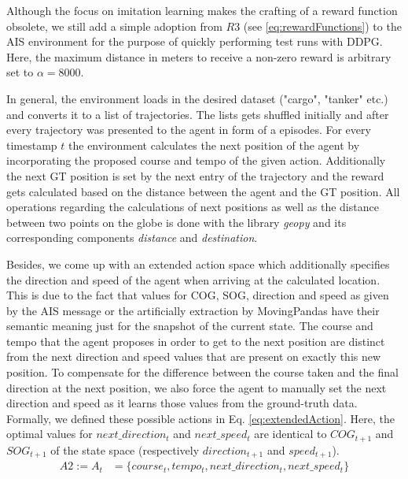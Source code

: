 Although the focus on imitation learning makes the crafting of a reward function obsolete, we still add a simple adoption from $R3$ (see \ref{eq:rewardFunctions}) to the AIS environment for the purpose of quickly performing test runs with DDPG. Here, the maximum distance in meters to receive a non-zero reward is arbitrary set to $\alpha=8000$.
\par
In general, the environment loads in the desired dataset ("cargo", "tanker" etc.) and converts it to a list of trajectories. The lists gets shuffled initially and after every trajectory was presented to the agent in form of a episodes. For every timestamp $t$ the environment calculates the next position of the agent by incorporating the proposed course and tempo of the given action. Additionally the next GT position is set by the next entry of the trajectory and the reward gets calculated based on the distance between the agent and the GT position. All operations regarding the calculations of next positions as well as the distance between two points on the globe is done with the library \textit{geopy} and its corresponding components \textit{distance} and \textit{destination}.
\par
Besides, we come up with an extended action space which additionally specifies the direction and speed of the agent when arriving at the calculated location. This is due to the fact that values for COG, SOG, direction and speed as given by the AIS message or the artificially extraction by MovingPandas have their semantic meaning just for the snapshot of the current state. The course and tempo that the agent proposes in order to get to the next position are distinct from the next direction and speed values that are present on exactly this new position. To compensate for the difference between the course taken and the final direction at the next position, we also force the agent to manually set the next direction and speed as it learns those values from the ground-truth data. Formally, we defined these possible actions in Eq.  \ref{eq:extendedAction}. Here, the optimal values for $next\_direction_t$ and $next\_speed_t$ are identical to $COG_{t+1}$ and $SOG_{t+1}$ of the state space (respectively $direction_{t+1}$ and $speed_{t+1}$).
\begin{equation}
\begin{aligned}
    A2 := A_t &= \{course_t, tempo_t, next\_direction_t, next\_speed_t\}
    \end{aligned}
\end{equation} \label{eq:extendedAction}

